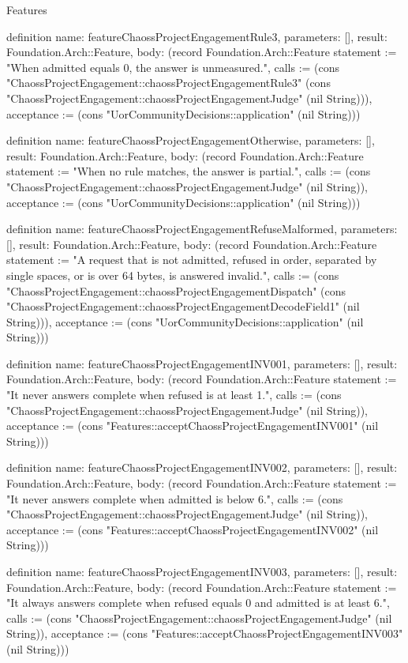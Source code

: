 \begin{lexlean}{Features}
\begin{semanticmodule}
definition{
  name: featureChaossProjectEngagementRule3,
  parameters: [],
  result: Foundation.Arch::Feature,
  body: (record Foundation.Arch::Feature {statement := "When admitted equals 0, the answer is unmeasured.", calls := (cons "ChaossProjectEngagement::chaossProjectEngagementRule3" (cons "ChaossProjectEngagement::chaossProjectEngagementJudge" (nil String))), acceptance := (cons "UorCommunityDecisions::application" (nil String))})
}

definition{
  name: featureChaossProjectEngagementOtherwise,
  parameters: [],
  result: Foundation.Arch::Feature,
  body: (record Foundation.Arch::Feature {statement := "When no rule matches, the answer is partial.", calls := (cons "ChaossProjectEngagement::chaossProjectEngagementJudge" (nil String)), acceptance := (cons "UorCommunityDecisions::application" (nil String))})
}

definition{
  name: featureChaossProjectEngagementRefuseMalformed,
  parameters: [],
  result: Foundation.Arch::Feature,
  body: (record Foundation.Arch::Feature {statement := "A request that is not admitted, refused in order, separated by single spaces, or is over 64 bytes, is answered invalid.", calls := (cons "ChaossProjectEngagement::chaossProjectEngagementDispatch" (cons "ChaossProjectEngagement::chaossProjectEngagementDecodeField1" (nil String))), acceptance := (cons "UorCommunityDecisions::application" (nil String))})
}

definition{
  name: featureChaossProjectEngagementINV001,
  parameters: [],
  result: Foundation.Arch::Feature,
  body: (record Foundation.Arch::Feature {statement := "It never answers complete when refused is at least 1.", calls := (cons "ChaossProjectEngagement::chaossProjectEngagementJudge" (nil String)), acceptance := (cons "Features::acceptChaossProjectEngagementINV001" (nil String))})
}

definition{
  name: featureChaossProjectEngagementINV002,
  parameters: [],
  result: Foundation.Arch::Feature,
  body: (record Foundation.Arch::Feature {statement := "It never answers complete when admitted is below 6.", calls := (cons "ChaossProjectEngagement::chaossProjectEngagementJudge" (nil String)), acceptance := (cons "Features::acceptChaossProjectEngagementINV002" (nil String))})
}

definition{
  name: featureChaossProjectEngagementINV003,
  parameters: [],
  result: Foundation.Arch::Feature,
  body: (record Foundation.Arch::Feature {statement := "It always answers complete when refused equals 0 and admitted is at least 6.", calls := (cons "ChaossProjectEngagement::chaossProjectEngagementJudge" (nil String)), acceptance := (cons "Features::acceptChaossProjectEngagementINV003" (nil String))})
}


\end{semanticmodule}
\end{lexlean}

